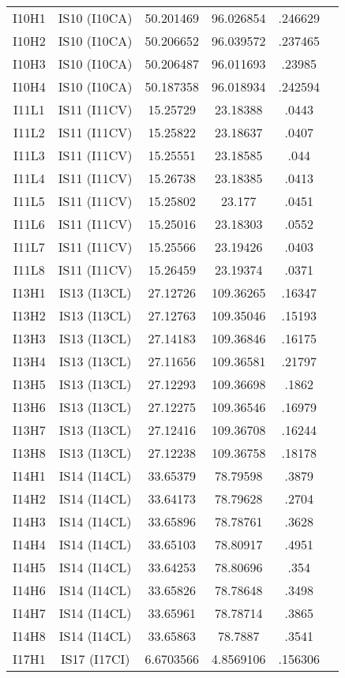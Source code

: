 \documentclass[a4paper, 10pt]{report}
\begin{document}
{\begin{center}
\begin{tabular}{|c|c|c|c|c|c|}
\hline
I10H1&	IS10 (I10CA)&	 	50.201469&	96.026854&	.246629\\
I10H2&	IS10 (I10CA)&	 	50.206652&	96.039572&	.237465\\
I10H3&	IS10 (I10CA)&	 	50.206487&	96.011693&	.23985\\
I10H4&	IS10 (I10CA)&	 	50.187358&	96.018934&	.242594\\
I11L1&	IS11 (I11CV)&	 	15.25729&	23.18388&	.0443\\
I11L2&	IS11 (I11CV)&	 	15.25822&	23.18637&	.0407\\
I11L3&	IS11 (I11CV)&	 	15.25551&	23.18585&	.044\\
I11L4&	IS11 (I11CV)&	 	15.26738&	23.18385&	.0413\\
I11L5&	IS11 (I11CV)&	 	15.25802&	23.177&	.0451\\
I11L6&	IS11 (I11CV)&	 	15.25016&	23.18303&	.0552\\
I11L7&	IS11 (I11CV)&	 	15.25566&	23.19426&	.0403\\
I11L8&	IS11 (I11CV)&	 	15.26459&	23.19374&	.0371\\
I13H1&	IS13 (I13CL)&	 	27.12726&	109.36265&	.16347\\
I13H2&	IS13 (I13CL)&	 	27.12763&	109.35046&	.15193\\
I13H3&	IS13 (I13CL)&	 	27.14183&	109.36846&	.16175\\
I13H4&	IS13 (I13CL)&	 	27.11656&	109.36581&	.21797\\
I13H5&	IS13 (I13CL)&	 	27.12293&	109.36698&	.1862\\
I13H6&	IS13 (I13CL)&	 	27.12275&	109.36546&	.16979\\
I13H7&	IS13 (I13CL)&	 	27.12416&	109.36708&	.16244\\
I13H8&	IS13 (I13CL)&	 	27.12238&	109.36758&	.18178\\
I14H1&	IS14 (I14CL)&	 	33.65379&	78.79598&	.3879\\
I14H2&	IS14 (I14CL)&	 	33.64173&	78.79628&	.2704\\
I14H3&	IS14 (I14CL)&	 	33.65896&	78.78761&	.3628\\
I14H4&	IS14 (I14CL)&	 	33.65103&	78.80917&	.4951\\
I14H5&	IS14 (I14CL)&	 	33.64253&	78.80696&	.354\\
I14H6&	IS14 (I14CL)&	 	33.65826&	78.78648&	.3498\\
I14H7&	IS14 (I14CL)&	 	33.65961&	78.78714&	.3865\\
I14H8&	IS14 (I14CL)&	 	33.65863&	78.7887&	.3541\\
I17H1&	IS17 (I17CI)&	 	6.6703566&	4.8569106&	.156306\\

\end{tabular}
\end{center}}
\end{document}
